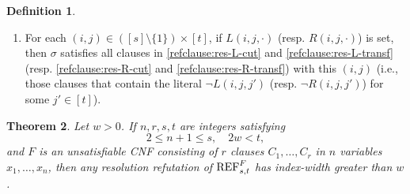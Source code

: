 \documentclass[10pt,a4paper]{article}
\newtheorem{theorem}{Theorem}
\theoremstyle{remark}
\newtheorem*{switching lemma}{Switching Lemma}
\newtheorem*{open problem}{Open Problem}
\theoremstyle{definition}
\newtheorem{definition}[theorem]{Definition}
\begin{document}
\begin{definition}
\begin{enumerate}[({A}1)]
\item \label{item:admissible-RL-cut-variable_and_RL-transf} For each $(i, j) \in ([s] \setminus \{1\}) \times [t]$, if $L(i,j,\cdot )$ (resp. $R(i,j,\cdot )$) is set, then $\sigma$ satisfies all clauses in \eqref{refclause:res-L-cut} and \eqref{refclause:res-L-transf} (resp. \eqref{refclause:res-R-cut} and \eqref{refclause:res-R-transf}) with this $(i,j)$ (i.e., those clauses that contain the literal $\neg L(i,j,j')$ (resp. $\neg R(i,j,j')$) for some $j' \in [t]$).
\end{enumerate}
\end{definition}



\begin{theorem}
\label{thm:width_lb}
Let $w>0$. If $n,r,s,t$ are integers satisfying 
\begin{equation}
\label{eq:conditions_on_n,r,s,t,w_in_width_lb_theorem} 
2 \leq n+1 \leq s, \quad 2w < t,
\end{equation}
and $F$ is an unsatisfiable CNF consisting of $r$ clauses $C_1,\ldots, C_r$ in $n$ variables $x_1,\ldots, x_n$, then any resolution refutation of $\textnormal{REF}^{F}_{s,t}$ has index-width greater than $w$.
\end{theorem}
 
\end{document}

